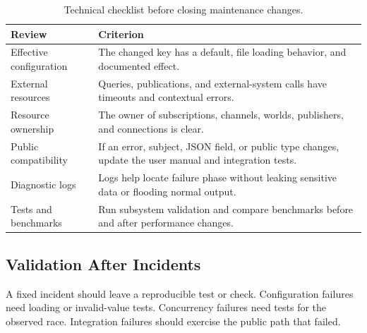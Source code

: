 \documentclass[12pt,a4paper]{report}
\begin{document}
\begin{table}[H]
\centering
\begin{tabular}{|p{}|p{}|}
\hline
\textbf{Review} & \textbf{Criterion} \\
\hline
Effective configuration &
The changed key has a default, file loading behavior, and documented effect. \\
\hline
External resources &
Queries, publications, and external-system calls have timeouts and contextual
errors. \\
\hline
Resource ownership &
The owner of subscriptions, channels, worlds, publishers, and connections is
clear. \\
\hline
Public compatibility &
If an error, subject, JSON field, or public type changes, update the user manual
and integration tests. \\
\hline
Diagnostic logs &
Logs help locate failure phase without leaking sensitive data or flooding normal
output. \\
\hline
Tests and benchmarks &
Run subsystem validation and compare benchmarks before and after performance
changes. \\
\hline
\end{tabular}
\caption{Technical checklist before closing maintenance changes.}
\end{table}

\subsection{Validation After Incidents}

A fixed incident should leave a reproducible test or check. Configuration
failures need loading or invalid-value tests. Concurrency failures need tests for
the observed race. Integration failures should exercise the public path that
failed.
\end{document}
